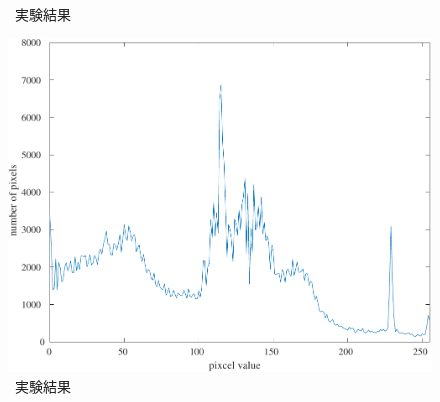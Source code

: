 \begin{figure}[H]
\begin{minipage}[b]{.7\textwidth}
\begin{minipage}[b]{.3\textwidth}
        \end{minipage}
        \caption{\kadaiad\ 実験結果}
    \end{minipage}
    \begin{minipage}[b]{.25\textwidth}
        \centering
        \includegraphics[keepaspectratio,width=\textwidth]{../../Figures/05_50_graph.pdf}
        \caption{\kadaiae\ 実験結果}
    \end{minipage}
\end{figure}
